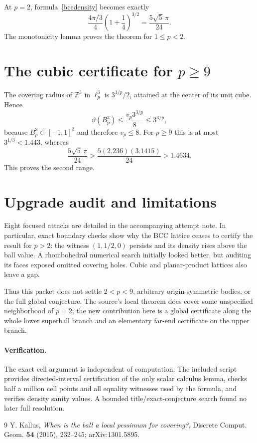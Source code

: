 \documentclass[11pt]{article}
\newcommand{\Z}{\mathbb Z}
\begin{document}
At $p=2$, formula~\eqref{bccdensity} becomes exactly
\[
 \frac{4\pi/3}{4}\left(1+\frac14\right)^{3/2}
 =\frac{5\sqrt5\,\pi}{24}.
\]
The monotonicity lemma proves the theorem for $1\le p<2$.

\section*{The cubic certificate for $p\ge9$}

The covering radius of $\Z^3$ in $\ell_p^3$ is
$3^{1/p}/2$, attained at the center of its unit cube.  Hence
\[
 \vartheta(B_p^3)
 \le \frac{v_p3^{3/p}}8
 \le 3^{3/p},
\]
because $B_p^3\subset[-1,1]^3$ and therefore $v_p\le8$.
For $p\ge9$ this is at most $3^{1/3}<1.443$, whereas
\[
 \frac{5\sqrt5\,\pi}{24}
 >\frac{5(2.236)(3.1415)}{24}>1.4634.
\]
This proves the second range.

\section*{Upgrade audit and limitations}

Eight focused attacks are detailed in the accompanying attempt note.  In
particular, exact boundary checks show why the BCC lattice ceases to certify
the result for $p>2$: the witness $(1,1/2,0)$ persists and its density rises
above the ball value.  A rhombohedral numerical search initially looked
better, but auditing its faces exposed omitted covering holes.  Cubic and
planar-product lattices also leave a gap.

Thus this packet does not settle $2<p<9$, arbitrary origin-symmetric bodies,
or the full global conjecture.  The source's local theorem does cover some
unspecified neighborhood of $p=2$; the new contribution here is a global
certificate along the whole lower superball branch and an elementary far-end
certificate on the upper branch.

\paragraph{Verification.}
The exact cell argument is independent of computation.  The included script
provides directed-interval certification of the only scalar calculus lemma,
checks half a million cell points and all equality witnesses used by the
formula, and verifies density sanity values.  A bounded title/exact-conjecture
search found no later full resolution.

\begin{thebibliography}{9}
Y. Kallus,
\emph{When is the ball a local pessimum for covering?},
Discrete Comput. Geom. \textbf{54} (2015), 232--245;
arXiv:1301.5895.
\end{thebibliography}
\end{document}
